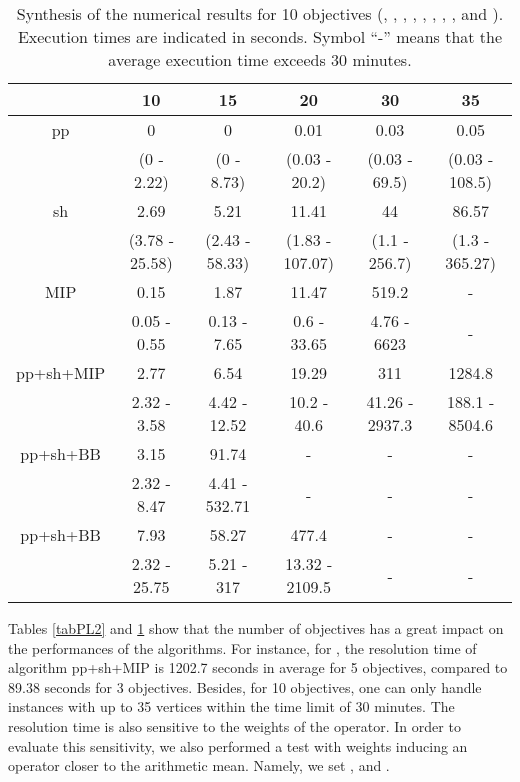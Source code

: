 \documentclass[final,3p,times]{elsarticle}
\begin{document}
\begin{table}[!h]
  \begin{center}
 {\small  \begin{tabular}{|c|ccccc|}
    \hline
      \rule[1pt]{0pt}{13pt} 
    & 10&15&20&30&35\\
    \hline
 pp  & 0&0&0.01&0.03&0.05\\
    	 &(0 - 2.22)&(0 - 8.73)&(0.03 - 20.2)&(0.03 - 69.5)&(0.03 - 108.5)\\
 sh& 2.69&5.21&11.41&44&86.57\\
    	 &(3.78 - 25.58)&(2.43 - 58.33)&(1.83 - 107.07)&(1.1 - 256.7)&(1.3 - 365.27)\\
    \hline
 MIP&0.15&1.87&11.47&519.2&-\\
    & 0.05 - 0.55&0.13 - 7.65&0.6 - 33.65&4.76 - 6623& - \\
  pp+sh+MIP& 2.77&6.54&19.29&311&1284.8\\
  &  2.32 - 3.58&4.42 - 12.52&10.2 - 40.6&41.26 - 2937.3&188.1 - 8504.6\\
  pp+sh+BB & 3.15&91.74&-&-&-\\
  & 2.32 - 8.47&4.41 - 532.71& - & - & - \\
pp+sh+BB& 7.93&58.27&477.4&-&-\\
    & 2.32 - 25.75&5.21 - 317&13.32 - 2109.5& - & - \\
  \hline
    \end{tabular}
}
\end{center}
\caption{\label{tabPL3} Synthesis of the numerical results for 10 objectives (, ,
  , , , , ,
  ,  and ). Execution times are indicated in seconds. Symbol ``-'' means that the average execution time exceeds 30 minutes.}
\end{table}

Tables \ref{tabPL2} and \ref{tabPL3} show that the number of objectives has a great impact on the performances of the algorithms. For instance, for , the resolution time of algorithm pp+sh+MIP is 1202.7 seconds in average for 5 objectives, compared to 89.38 seconds for 3 objectives. Besides, for 10 objectives, one can only handle instances with up to 35 vertices within the time limit of 30 minutes.
The resolution time is also sensitive to the weights of the  operator. In order to evaluate this sensitivity, we also performed a test with weights inducing an 
operator closer to the arithmetic mean. Namely, we set ,  and .
\end{document}
